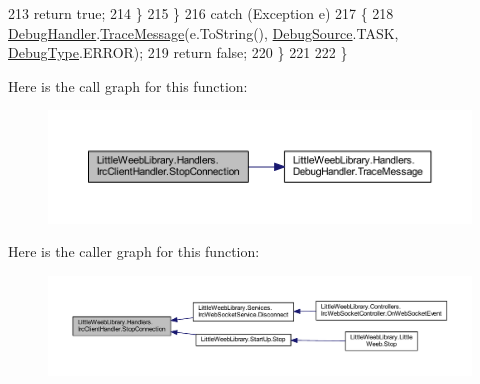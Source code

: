 \begin{DoxyCode}
213                     \textcolor{keywordflow}{return} \textcolor{keyword}{true};
214                 \}
215             \}
216             \textcolor{keywordflow}{catch} (Exception e)
217             \{
218                 \mbox{\hyperlink{class_little_weeb_library_1_1_handlers_1_1_irc_client_handler_ab50ece494948d25db1839f4d6eab038f}{DebugHandler}}.\mbox{\hyperlink{interface_little_weeb_library_1_1_handlers_1_1_i_debug_handler_a2e405bc3492e683cd3702fae125221bc}{TraceMessage}}(e.ToString(), 
      \mbox{\hyperlink{namespace_little_weeb_library_1_1_handlers_a2a6ca0775121c9c503d58aa254d292be}{DebugSource}}.TASK, \mbox{\hyperlink{namespace_little_weeb_library_1_1_handlers_ab66019ed40462876ec4e61bb3ccb0a62}{DebugType}}.ERROR);
219                 \textcolor{keywordflow}{return} \textcolor{keyword}{false};
220             \}
221 
222         \}
\end{DoxyCode}
Here is the call graph for this function\+:\nopagebreak
\begin{figure}[H]
\begin{center}
\leavevmode
\includegraphics[width=350pt]{class_little_weeb_library_1_1_handlers_1_1_irc_client_handler_a97a617b50a161906a91ce1ea483a1770_cgraph}
\end{center}
\end{figure}
Here is the caller graph for this function\+:\nopagebreak
\begin{figure}[H]
\begin{center}
\leavevmode
\includegraphics[width=350pt]{class_little_weeb_library_1_1_handlers_1_1_irc_client_handler_a97a617b50a161906a91ce1ea483a1770_icgraph}
\end{center}
\end{figure}
\mbox{\label{class_little_weeb_library_1_1_handlers_1_1_irc_client_handler_a265ca021f5086addf758e87f59a0aa11}} 
